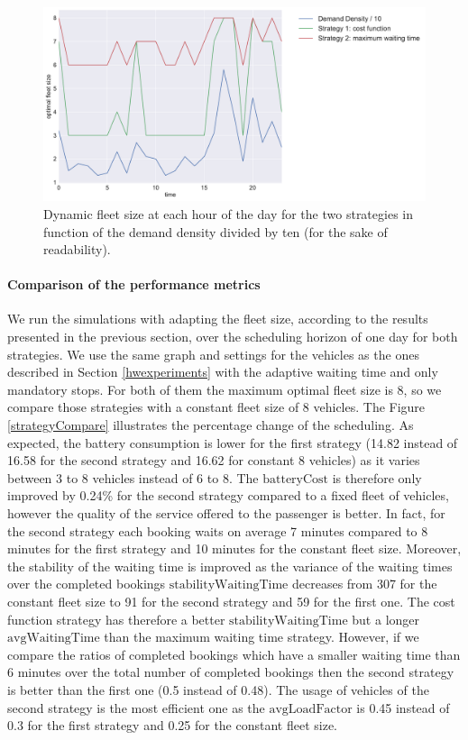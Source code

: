 \documentclass[12pt,a4paper]{article}
\begin{document}
\begin{figure}[h] 
  \centering
\includegraphics[scale=0.43]{./images/optimalFleet.pdf}
  \caption{Dynamic fleet size at each hour of the day for the two strategies in function of the demand density divided by ten (for the sake of readability).}
\label{optfleet}
\end{figure}

\paragraph{Comparison of the performance metrics}
We run the simulations with adapting the fleet size, according to the results presented in the previous section, over the scheduling horizon of one day for both strategies. We use the same graph and settings for the vehicles as the ones described in Section \ref{hwexperiments} with the adaptive waiting time and only mandatory stops. For both of them the maximum optimal fleet size is 8, so we compare those strategies with a constant fleet size of 8 vehicles. The Figure \ref{strategyCompare} illustrates the percentage change of the scheduling. As expected, the battery consumption is lower for the first strategy (14.82 instead of 16.58 for the second strategy and 16.62 for constant 8 vehicles) as it varies between 3 to 8 vehicles instead of 6 to 8. The $\text{batteryCost}$ is therefore only improved by 0.24\% for the second strategy compared to a fixed fleet of vehicles, however the quality of the service offered to the passenger is better. In fact, for the second strategy each booking waits on average 7 minutes compared to 8 minutes for the first strategy and 10 minutes for the constant fleet size. Moreover, the stability of the waiting time is improved as the variance of the waiting times over the completed bookings $\text{stabilityWaitingTime}$ decreases from 307 for the constant fleet size to 91 for the second strategy and 59 for the first one. The cost function strategy has therefore a better $\text{stabilityWaitingTime}$ but a longer $\text{avgWaitingTime}$ than the maximum waiting time strategy. However, if we compare the ratios of completed bookings which have a smaller waiting time than 6 minutes over the total number of completed bookings then the second strategy is better than the first one (0.5 instead of 0.48). The usage of vehicles of the second strategy is the most efficient one as the $\text{avgLoadFactor}$ is 0.45 instead of 0.3 for the first strategy and 0.25 for the constant fleet size.
\end{document}

